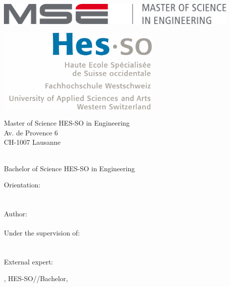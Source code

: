 
\begin{titlepage}
{\selectfont
	\begin{flushright}
		\begin{minipage}{0.5\textwidth}
			\begin{flushleft}
				\includegraphics[width=0.9\textwidth]{img/mse_logo}
			\end{flushleft}
		\end{minipage}%
		\begin{minipage}{0.5\textwidth}
			\begin{flushright}
				\includegraphics[width=0.6\textwidth]{img/hesso_logo}
			\end{flushright}
		\end{minipage}
		\begin{flushleft}
			\footnotesize
			Master of Science HES-SO in Engineering \\
			Av. de Provence 6 \\
			CH-1007 Lausanne
		\end{flushleft}
		~\\[0.5cm]
		
		{
		\Huge Bachelor of Science HES-SO in Engineering\\[0.5cm]
		}
		
		{
		\LARGE Orientation: \Orientation\\[0.5cm]
		~\\[1cm]
		}
		{
			\Huge
			\ThesisTitle \\[1.5cm]
		}
		{
			\large
			Author:\\[-0.3cm]
			\Huge \Author \\[0.8cm]
		}
		{
			\large
			Under the supervision of: \\
			\Advisor \\
			\AdvisorResearchUnit \\[0.5cm]
		}
		{
			\large
			External expert: \\
			\Expert
		}
		\vfill
		
		{\large \Place, HES-SO//Bachelor, \Date}
		
	\end{flushright}
}
\restoregeometry
\end{titlepage}



